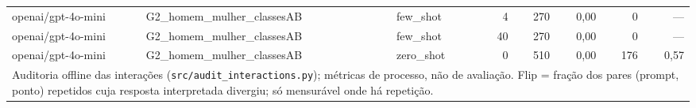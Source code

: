 \begin{table}[htbp]
\begin{tabular}{lllrrrrr}
openai/gpt-4o-mini & G2\_homem\_mulher\_classesAB & few\_shot & 4 & 270 & 0,00 & 0 & — \\
openai/gpt-4o-mini & G2\_homem\_mulher\_classesAB & few\_shot & 40 & 270 & 0,00 & 0 & — \\
openai/gpt-4o-mini & G2\_homem\_mulher\_classesAB & zero\_shot & 0 & 510 & 0,00 & 176 & 0,57 \\
\bottomrule
\multicolumn{8}{p{0.95\linewidth}}{\footnotesize Auditoria offline das interações (\texttt{src/audit\_interactions.py}); métricas de processo, não de avaliação. Flip = fração dos pares (prompt, ponto) repetidos cuja resposta interpretada divergiu; só mensurável onde há repetição.} \\
\end{tabular}
\end{table}

